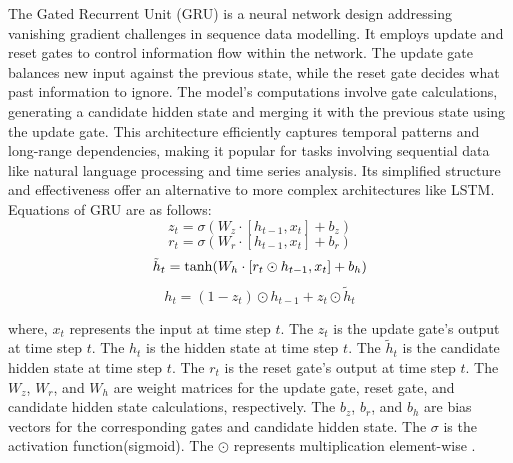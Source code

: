 \documentclass[sn-mathphys,Numbered]{sn-jnl}
\theoremstyle{thmstyleone}
\theoremstyle{thmstyletwo}
\theoremstyle{thmstylethree}
\begin{document}
The Gated Recurrent Unit (GRU) is a neural network design addressing vanishing gradient challenges in sequence data modelling. It employs update and reset gates to control information flow within the network. The update gate balances new input against the previous state, while the reset gate decides what past information to ignore. The model's computations involve gate calculations, generating a candidate hidden state and merging it with the previous state using the update gate. This architecture efficiently captures temporal patterns and long-range dependencies, making it popular for tasks involving sequential data like natural language processing and time series analysis. Its simplified structure and effectiveness offer an alternative to more complex architectures like LSTM. Equations of GRU are as follows:
\begin{equation}
z_t = \sigma(W_z \cdot [h_{t-1}, x_t] + b_z)
\end{equation}
\begin{equation}
r_t = \sigma(W_r \cdot [h_{t-1}, x_t] + b_r)
\end{equation}
\begin{equation}
\tilde{h}_t = \tanh(W_h \cdot [r_t \odot h_{t-1}, x_t] + b_h) \\
\end{equation}
\begin{equation}
h_t = (1 - z_t) \odot h_{t-1} + z_t \odot \tilde{h}_t
\end{equation}



where, \(x_t\) represents the input at time step \(t\). The
\(z_t\) is the update gate's output at time step \(t\). The
\(h_t\) is the hidden state at time step \(t\). The
\(\tilde{h}_t\) is the candidate hidden state at time step \(t\). The
\(r_t\) is the reset gate's output at time step \(t\). The
\(W_z\), \(W_r\), and \(W_h\) are weight matrices for the update gate, reset gate, and candidate hidden state calculations, respectively. The
\(b_z\), \(b_r\), and \(b_h\) are bias vectors for the corresponding gates and candidate hidden state. The
\(\sigma\) is the activation function(sigmoid). The
\(\odot\) represents multiplication element-wise .
\end{document}
